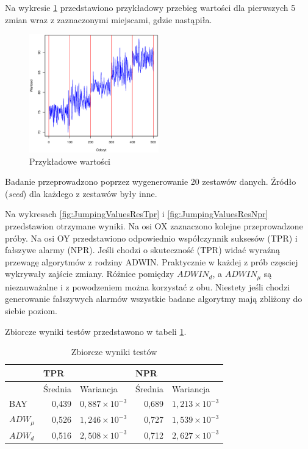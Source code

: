 Na wykresie \ref{fig:JumpingValues} przedstawiono przykładowy przebieg wartości dla pierwszych 5 zmian
wraz z zaznaczonymi miejscami,
gdzie nastąpiła.
\begin{figure}[htbp]
  \centering
  \includegraphics[width=0.5\textwidth]{img/ch-5-jumping}
  \caption{Przykładowe wartości}
  \label{fig:JumpingValues}
\end{figure}
Badanie przeprowadzono poprzez wygenerowanie 20 zestawów danych.
Źródło (\textit{seed}) dla każdego z zestawów były inne.

Na wykresach \ref{fig:JumpingValuesResTpr} i \ref{fig:JumpingValuesResNpr} przedstawion otrzymane wyniki.
Na osi OX zaznaczono kolejne przeprowadzone próby.
Na osi OY przedstawiono odpowiednio współczynnik suksesów (TPR) i fałszywe alarmy (NPR).
Jeśli chodzi o skuteczność (TPR) widać wyraźną przewagę algorytmów z rodziny ADWIN.
Praktycznie w każdej z prób częsciej wykrywały zajście zmiany.
Różnice pomiędzy $ADWIN_d$,
a $ADWIN_{\mu}$ są niezauważalne i z powodzeniem można korzystać z obu.
Niestety jeśli chodzi generowanie fałszywych alarmów wszystkie badane algorytmy
mają zbliżony do siebie poziom.

Zbiorcze wyniki testów przedstawono w tabeli \ref{tab:JumpingResult}.
\begin{table}[h]
  \label{tab:JumpingResult}
  \centering
  \begin{tabular}{l r r r r}
    & \multicolumn{2}{l}{TPR} & \multicolumn{2}{l}{NPR} \\
    \hline
    & \multicolumn{1}{l}{Średnia} & \multicolumn{1}{l}{Wariancja}& \multicolumn{1}{l}{Średnia} & \multicolumn{1}{l}{Wariancja} \\
    \hline
    BAY & 0,439 & $0,887 \times 10^{-3}$ & 0,689 & $1,213 \times 10^{-3}$  \\
    $ADW_{\mu}$ & 0,526 & $1,246 \times 10^{-3}$ & 0,727 & $1,539 \times 10^{-3}$ \\
    $ADW_{d}$ & 0,516 & $2,508 \times 10^{-3}$ & 0,712 & $2,627 \times 10^{-3}$ \\
  \end{tabular}
  \caption{Zbiorcze wyniki testów}
\end{table}

